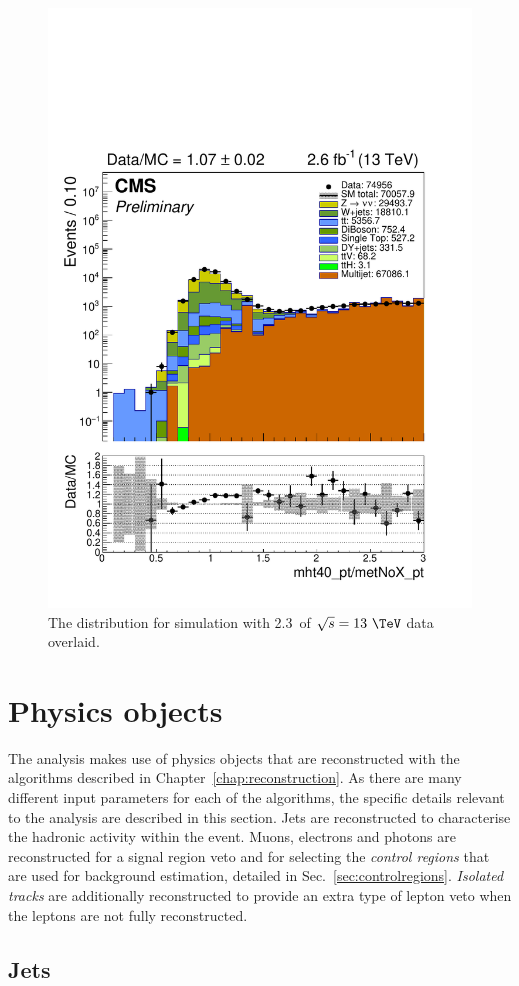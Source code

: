 \begin{figure}
	\begin{center}
		\includegraphics[width=0.5\linewidth]{figs/analysis/eventSelection/mht40_pt_Div_metNoX_pt_all_all_80X_noOverflow_scaled0p6}%
	\end{center}
  \caption{The \mhtmet distribution for \MC simulation with
  2.3~\ifb of $\sqrt{s}=13~\tev$ data overlaid.}
	\label{fig:mhtDivMet}
\end{figure}

\section{Physics objects} %
\label{sec:physobj}

The analysis makes use of physics objects that are reconstructed with
the algorithms described in Chapter~\ref{chap:reconstruction}. As
there are many different input parameters for each of the
algorithms, the specific details relevant to the analysis are
described in this section. Jets are reconstructed to characterise the
hadronic activity within the event. Muons, electrons and photons are
reconstructed for a signal region veto and for selecting the \emph{control
regions} that are used for background estimation, detailed in
Sec.~\ref{sec:controlregions}. \emph{Isolated tracks} are additionally
reconstructed to provide an extra type of lepton veto when the leptons
are not fully reconstructed.

\subsection{Jets}
\label{sec:evSel_jets}

